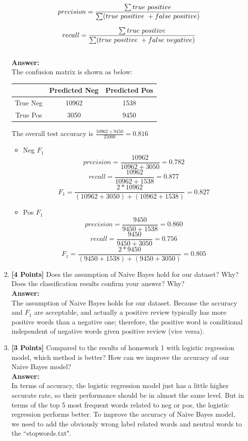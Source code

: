 \documentclass{article}
\begin{document}
\begin{enumerate}
	\begin{equation}\label{eqn:precision}
	\ precision =  {\sum true\ positive\over \sum (true\ positive\ +  false\ positive)}
	\end{equation}
	
	\begin{equation}\label{eqn:recall}
	\ recall =  {\sum true\ positive\over \sum (true\ positive\ +  false\ negative)}
	\end{equation}\\
	\textbf{Answer:}\\
	The confusion matrix is shown as below:
	\begin{table}[!h]
		\centering
		\begin{tabular}{|c|c|c|}
			\hline
			  & Predicted Neg & Predicted Pos \\
			  \hline
		True Neg & 10962	& 1538 \\
		\hline
		True Pos & 3050		& 9450  \\
		\hline
		\end{tabular}
	\end{table}

	The overall test accuracy is $\frac{10962+9450}{25000}=0.816$
	
	\begin{itemize}
		\item Neg $F_1$
		$$precision = \frac{10962}{10962+3050} = 0.782$$
		$$recall = \frac{10962}{10962+1538} = 0.877$$
		$$F_1 = \frac{2*10962}{(10962+3050)+(10962+1538)}=0.827$$
		\item Pos $F_1$
		$$precision = \frac{9450}{9450+1538} = 0.860$$
		$$recall = \frac{9450}{9450+3050} = 0.756$$
		$$F_1 = \frac{2*9450}{(9450+1538)+(9450+3050)}=0.805$$
	\end{itemize}
		
	
	\item \textbf{[4 Points]} Does the assumption of Naive Bayes hold for our dataset? Why? Does the classification results confirm your answer? Why?\\
	\textbf{Answer:}\\
	The assumption of Naive Bayes holds for our dataset. Because the accuracy and $F_1$ are acceptable, and actually a positive review typically has more positive words than a negative one; therefore, the positive word is conditional independent of negative words given positive review (vice versa).
	
	
	\item \textbf{[3 Points]} Compared to the results of homework 1 with logistic regression model, which method is better? How can we improve the accuracy of our Naive Bayes model?\\
	\textbf{Answer:}\\
	In terms of accuracy, the logistic regression model just has a little higher accurate rate, so their performance should be in almost the same level. But in terms of the top 5 most frequent words related to neg or pos, the logistic regression performs better. To improve the accuracy of Naive Bayes model, we need to add the obviously wrong label related words and neutral words to the ``stopwords.txt".
	
\end{enumerate}
\end{document}
